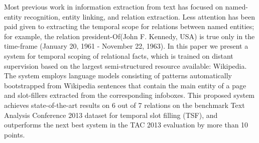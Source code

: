 Most previous work in information extraction from text has focused on named-entity recognition, entity linking, and relation extraction. Less attention has been paid given to extracting the temporal scope for relations between named entities; for example, the relation president-Of(John F. Kennedy, USA) is true only in the time-frame (January 20, 1961 - November 22, 1963). In this paper we present a system for temporal scoping of relational facts, which is trained on distant supervision based on the largest semi-structured resource available: Wikipedia. The system employs language models consisting of patterns automatically bootstrapped from Wikipedia sentences that contain the main entity of a page and slot-fillers extracted from the corresponding infoboxes. This proposed system achieves state-of-the-art results on 6 out of 7 relations on the benchmark Text Analysis Conference 2013 dataset for temporal slot filling (TSF), and outperforms the next best system in the TAC 2013 evaluation by more than 10 points.
